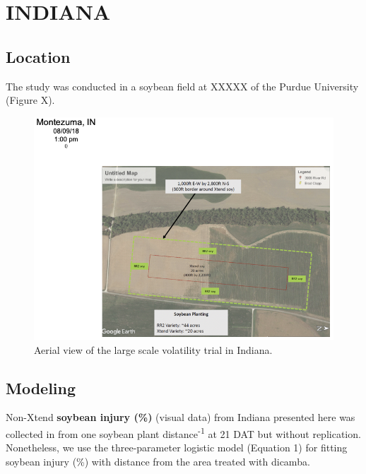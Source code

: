 \documentclass[]{article}
\begin{document}
\newpage

\pagebreak

\section{INDIANA}\label{indiana-1}

\subsection{Location}\label{location-1}

The study was conducted in a soybean field at XXXXX of the Purdue
University (Figure X).

\begin{figure}[h]

{\centering \includegraphics[width=1\linewidth]{Indiana} 

}

\caption{Aerial view of the large scale volatility trial in Indiana.}\label{fig:unnamed-chunk-21}
\end{figure}

\pagebreak
\newpage

\subsection{Modeling}\label{modeling-1}

Non-Xtend \textbf{soybean injury (\%)} (visual data) from Indiana
presented here was collected in from one soybean plant
distance\textsuperscript{-1} at 21 DAT but without replication.
Nonetheless, we use the three-parameter logistic model (Equation 1) for
fitting soybean injury (\%) with distance from the area treated with
dicamba.
\end{document}
